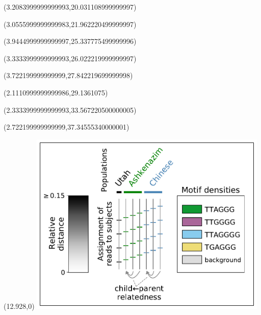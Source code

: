 \documentclass{article}
\begin{document}
\begin{textblock}{13}(3.2083999999999993,20.031108999999997)\end{textblock}
\begin{textblock}{13}(3.0555999999999983,21.962220499999997)\end{textblock}
\begin{textblock}{13}(3.9444999999999997,25.337775499999996)\end{textblock}
\begin{textblock}{13}(3.3333999999999993,26.022219999999997)\end{textblock}
\begin{textblock}{13}(3.722199999999999,27.842219699999998)\end{textblock}
\begin{textblock}{13}(2.1110999999999986,29.1361075)\end{textblock}
\begin{textblock}{13}(2.3333999999999993,33.567220500000005)\end{textblock}
\begin{textblock}{13}(2.722199999999999,37.34555340000001)\end{textblock}
\begin{textblock}{13}(12.928,0)
\includegraphics[width=4.500in,keepaspectratio]{haplotypes/haplotypes-legend.pdf}
\end{textblock}
\end{document}
